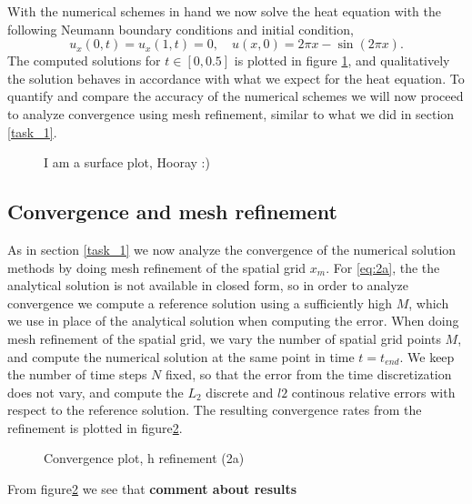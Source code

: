 With the numerical schemes in hand we now solve the heat equation with the following Neumann boundary conditions and initial condition, 
\begin{equation}
    u_x(0,t) = u_x(1,t) = 0, \quad u(x,0) = 2\pi x - \sin(2\pi x). 
    \label{eq:2a}
\end{equation}
The computed solutions for $t \in [0, 0.5]$ is plotted in figure \ref{fig:task2-surface}, 
and qualitatively the solution behaves in accordance with what we expect for the heat equation. 
To quantify and compare the accuracy of the numerical schemes we will now proceed to analyze convergence using mesh refinement, 
similar to what we did in section \ref{task_1}. 

\begin{figure}
    
    \caption{I am a surface plot, Hooray :)}
    \label{fig:task2-surface}
\end{figure}

\subsection{Convergence and mesh refinement}
As in section \ref{task_1} we now analyze the convergence of the numerical solution methods 
by doing mesh refinement of the spatial grid $x_m$. 
For \eqref{eq:2a}, the the analytical solution is not available in closed form, 
so in order to analyze convergence we compute a reference solution using a sufficiently high $M$, 
which we use in place of the analytical solution when computing the error. 
When doing mesh refinement of the spatial grid, 
we vary the number of spatial grid points $M$, 
and compute the numerical solution at the same point in time $t=t_{end}$. 
We keep the number of time steps $N$ fixed, 
so that the error from the time discretization does not vary, 
and compute the $L_2$ discrete and $l2$ continous relative errors with respect to the reference solution. 
The resulting convergence rates from the refinement is plotted in figure\ref{fig:2a-convergence}. 
\begin{figure}[ht]
    \centering
    
    \caption{Convergence plot, h refinement (2a)}
    \label{fig:2a-convergence}
\end{figure}

From figure\ref{fig:2a-convergence} we see that \textbf{comment about results}

